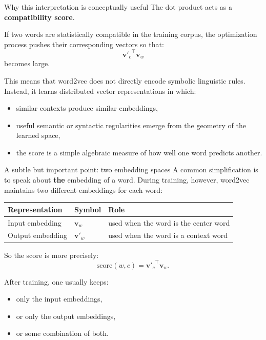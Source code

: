 \documentclass[11pt,aspectratio=169,professionalfonts]{beamer}
\begin{document}
\begin{frame}{Why this interpretation is conceptually useful}
The dot product acts as a \textbf{compatibility score}.

\vspace{0.3cm}

If two words are statistically compatible in the training corpus, the optimization process pushes their corresponding vectors so that:
\[
{\bm{v}'_c}^\top \bm{v}_w
\]
becomes large.

\vspace{0.3cm}

This means that word2vec does not directly encode symbolic linguistic rules. Instead, it learns distributed vector representations in which:
\begin{itemize}
    \item similar contexts produce similar embeddings,
    \item useful semantic or syntactic regularities emerge from the geometry of the learned space,
    \item the score is a simple algebraic measure of how well one word predicts another.
\end{itemize}
\end{frame}
%
%
\begin{frame}{A subtle but important point: two embedding spaces}
A common simplification is to speak about \textbf{the} embedding of a word. During training, however, word2vec maintains two different embeddings for each word:

\vspace{0.2cm}

\begin{center}
\begin{tabular}{lll}
\toprule
Representation & Symbol & Role \\
\midrule
Input embedding & $\bm{v}_w$ & used when the word is the center word \\
Output embedding & $\bm{v}'_w$ & used when the word is a context word \\
\bottomrule
\end{tabular}
\end{center}

So the score is more precisely:
\[
\text{score}(w,c) = {\bm{v}'_c}^\top \bm{v}_w.
\]

After training, one usually keeps:
\begin{itemize}
    \item only the input embeddings,
    \item or only the output embeddings,
    \item or some combination of both.
\end{itemize}
\end{frame}
\end{document}
